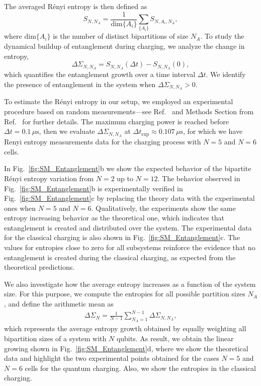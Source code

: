 \documentclass[aps,prl,epsfigure,twocolumn,superscriptaddress]{revtex4-2}
\newcommand{\1}{\mathbbm{1}}
\newcommand{\SubFig}[2]{\ref{#1}{\color{blue}#2}}
\begin{document}
{	The averaged Rényi entropy is then defined as
	\begin{equation}
		S_{N,N_A} = \frac{1}{\mathrm{dim}\{A_i\}} \sum_{\{A_i\}} S_{N,A_i,N_A} ,
	\end{equation}
	where $\mathrm{dim}\{A_i\}$ is the number of distinct bipartitions of size $N_A$.
	To study the dynamical buildup of entanglement during charging, we analyze the change in entropy,
	\begin{equation}
		\Delta \Sigma_{N,N_A} = S_{N,N_A}(\Delta t) - S_{N,N_A}(0) ,
	\end{equation}
	which quantifies the entanglement growth over a time interval $\Delta t$. We identify the presence of entanglement in the system when $\Delta \Sigma_{N,N_A} > 0$.

	To estimate the Rényi entropy in our setup, we employed an experimental procedure based on random measurements---see Ref.~\cite{Tiff:19} and Methods Section from Ref.~\cite{Hu:25} for further details. The maximum charging power is reached before $\Delta t =0.1 \, \mu\text{s}$, then we evaluate $\Delta \Sigma_{N,N_A}$ at $\Delta t_\mathrm{exp} \approx 0.107 \, \mu\text{s}$, for which we have Renyi entropy measurements data
	for the charging process with $N = 5$ and $N = 6$ cells.

	In Fig.~\SubFig{fig:SM_Entanglement}{b} we show the expected behavior of the bipartite Rényi entropy variation from $N=2$ up to $N=12$. The behavior observed in Fig.~\SubFig{fig:SM_Entanglement}{b} is experimentally verified in Fig.~\SubFig{fig:SM_Entanglement}{c} by replacing the theory data with the experimental ones when $N = 5$ and $N = 6$. Qualitatively, the experiments show the same entropy increasing behavior as the theoretical one, which indicates that entanglement is created and distributed over the system. The experimental data for the classical charging is also shown in Fig.~\SubFig{fig:SM_Entanglement}{c}. The values for entropies close to zero for all subsystems reinforce the evidence that no entanglement is created during the classical charging, as expected from the theoretical predictions.

	We also investigate how the average entropy increases as a function of the system size. For this purpose, we compute the entropies for all possible partition sizes $N_A$, and define the arithmetic mean as
	\begin{align}
		\Delta \Sigma_{N} = \frac{1}{N-1} \sum_{N_A = 1}^{N-1} \Delta \Sigma_{N,N_A} ,
	\end{align}
	which represents the average entropy growth obtained by equally weighting all bipartition sizes of a system with $N$ qubits. As result, we obtain the linear growing shown in Fig.~\SubFig{fig:SM_Entanglement}{d}, where we show the theoretical data and highlight the two experimental points obtained for the cases $N = 5$ and $N = 6$ cells for the quantum charging. Also, we show the entropies in the classical charging.



}
\end{document}
